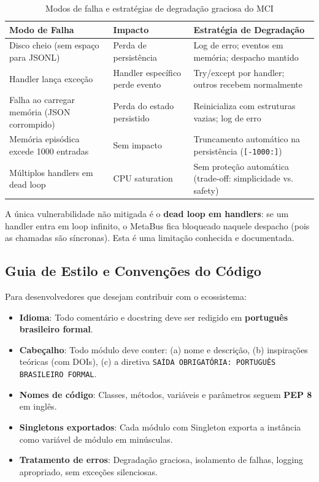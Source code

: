 \begin{table}[htbp]
\centering
\caption{Modos de falha e estratégias de degradação graciosa do MCI}
\label{tab:failure-modes}
\begin{tabular}{@{}p{3.5cm}p{4cm}p{5.5cm}@{}}
\toprule
\textbf{Modo de Falha} & \textbf{Impacto} & \textbf{Estratégia de Degradação} \\
\midrule
Disco cheio (sem espaço para JSONL) & Perda de persistência & Log de erro; eventos em memória; despacho mantido \\
Handler lança exceção & Handler específico perde evento & Try/except por handler; outros recebem normalmente \\
Falha ao carregar memória (JSON corrompido) & Perda do estado persistido & Reinicializa com estruturas vazias; log de erro \\
Memória episódica excede 1000 entradas & Sem impacto & Truncamento automático na persistência (\texttt{[-1000:]}) \\
Múltiplos handlers em dead loop & CPU saturation & Sem proteção automática (trade-off: simplicidade vs. safety) \\
\bottomrule
\end{tabular}
\end{table}

A única vulnerabilidade não mitigada é o \textbf{dead loop em handlers}: se um handler entra em loop infinito, o MetaBus fica bloqueado naquele despacho (pois as chamadas são síncronas). Esta é uma limitação conhecida e documentada.

\subsection{Guia de Estilo e Convenções do Código}

Para desenvolvedores que desejam contribuir com o ecossistema:

\begin{itemize}
    \item \textbf{Idioma}: Todo comentário e docstring deve ser redigido em \textbf{português brasileiro formal}.
    \item \textbf{Cabeçalho}: Todo módulo deve conter: (a) nome e descrição, (b) inspirações teóricas (com DOIs), (c) a diretiva \texttt{SAÍDA OBRIGATÓRIA: PORTUGUÊS BRASILEIRO FORMAL}.
    \item \textbf{Nomes de código}: Classes, métodos, variáveis e parâmetros seguem \textbf{PEP 8} em inglês.
    \item \textbf{Singletons exportados}: Cada módulo com Singleton exporta a instância como variável de módulo em minúsculas.
    \item \textbf{Tratamento de erros}: Degradação graciosa, isolamento de falhas, logging apropriado, sem exceções silenciosas.
\end{itemize}

